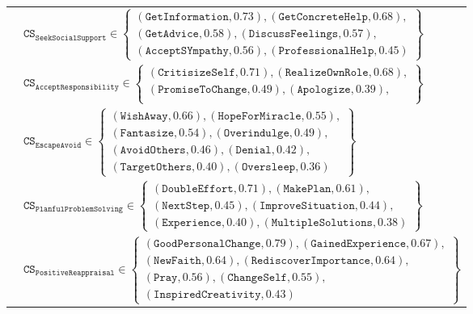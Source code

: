 \begin{minipage}{\textwidth}
\begin{tabular}{ p{\colAwidth}  p{\colBwidth}}
        & $\mathtt{CS_{SeekSocialSupport}} \in \left\{
        \begin{array}{l}
            (\mathtt{GetInformation}, 0.73), (\mathtt{GetConcreteHelp},
            0.68), \\
            (\mathtt{GetAdvice}, 0.58), (\mathtt{DiscussFeelings}, 0.57),
            \\
            (\mathtt{AcceptSYmpathy}, 0.56), (\mathtt{ProfessionalHelp},
            0.45)
        \end{array}  \right\}$ \\

        & $\mathtt{CS_{AcceptResponsibility}} \in \left\{
        \begin{array}{l}
            (\mathtt{CritisizeSelf}, 0.71), (\mathtt{RealizeOwnRole},
            0.68), \\
            (\mathtt{PromiseToChange}, 0.49), (\mathtt{Apologize}, 0.39),
            \\
        \end{array}  \right\}$ \\

        & $\mathtt{CS_{EscapeAvoid}} \in \left\{
        \begin{array}{l}
            (\mathtt{WishAway}, 0.66), (\mathtt{HopeForMiracle}, 0.55), \\
            (\mathtt{Fantasize}, 0.54), (\mathtt{Overindulge}, 0.49), \\
            (\mathtt{AvoidOthers}, 0.46), (\mathtt{Denial}, 0.42), \\
            (\mathtt{TargetOthers}, 0.40), (\mathtt{Oversleep}, 0.36)
        \end{array}  \right\}$ \\

        & $\mathtt{CS_{PlanfulProblemSolving}} \in \left\{
        \begin{array}{l}
            (\mathtt{DoubleEffort}, 0.71), (\mathtt{MakePlan}, 0.61), \\
            (\mathtt{NextStep}, 0.45), (\mathtt{ImproveSituation}, 0.44),
            \\
            (\mathtt{Experience}, 0.40), (\mathtt{MultipleSolutions}, 0.38)
        \end{array}  \right\}$ \\

        & $\mathtt{CS_{PositiveReappraisal}} \in \left\{
        \begin{array}{l}
            (\mathtt{GoodPersonalChange}, 0.79),
            (\mathtt{GainedExperience}, 0.67),
            \\
            (\mathtt{NewFaith}, 0.64), (\mathtt{RediscoverImportance},
            0.64), \\
            (\mathtt{Pray}, 0.56), (\mathtt{ChangeSelf}, 0.55), \\
            (\mathtt{InspiredCreativity}, 0.43)
        \end{array}  \right\}$ \\
        \hline
    \end{tabular}
\end{minipage}

